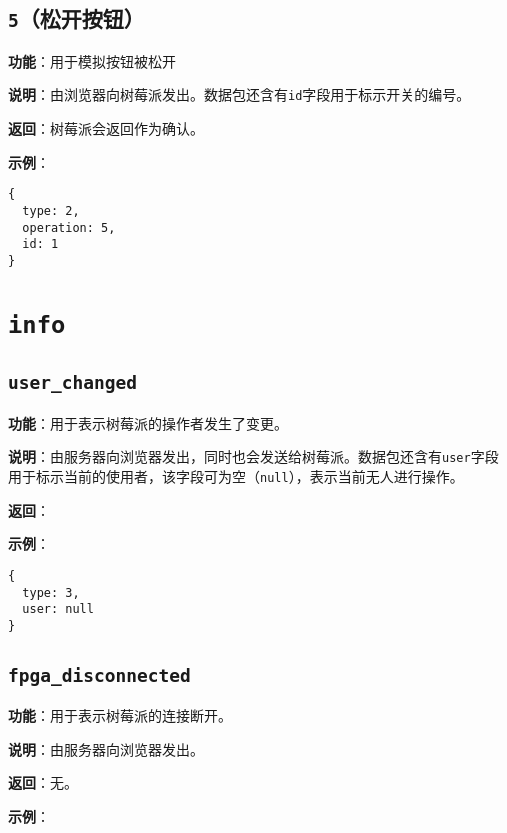 \documentclass{article}
\begin{document}
\subsection{\texttt{5}（松开按钮）}
\label{op:release_button}

\noindent\textbf{功能}：用于模拟按钮被松开

\noindent\textbf{说明}：由浏览器向树莓派发出。数据包还含有\texttt{id}字段用于标示开关的编号。

\noindent\textbf{返回}：树莓派会返回\texttt{}作为确认。

\noindent\textbf{示例}：

\begin{lstlisting}[style=json]
{
  type: 2,
  operation: 5,
  id: 1
}
\end{lstlisting}

\section{\texttt{info}}

\subsection{\texttt{user\_changed}}
\label{info:user_changed}

\noindent\textbf{功能}：用于表示树莓派的操作者发生了变更。

\noindent\textbf{说明}：由服务器向浏览器发出，同时也会发送给树莓派。数据包还含有\texttt{user}字段用于标示当前的使用者，该字段可为空（\texttt{null}），表示当前无人进行操作。

\noindent\textbf{返回}：

\noindent\textbf{示例}：

\begin{lstlisting}[style=json]
{
  type: 3,
  user: null
}
\end{lstlisting}

\subsection{\texttt{fpga\_disconnected}}
\label{info:fpga_disconnected}

\noindent\textbf{功能}：用于表示树莓派的连接断开。

\noindent\textbf{说明}：由服务器向浏览器发出。

\noindent\textbf{返回}：无。

\noindent\textbf{示例}：
\end{document}
